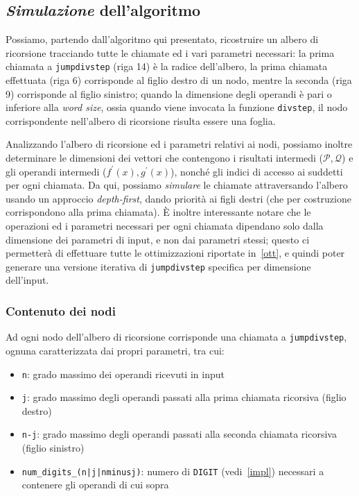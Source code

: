     \subsection*{\textbf{\textit{Simulazione} dell'algoritmo}} Possiamo, partendo dall'algoritmo qui presentato, ricostruire un albero di ricorsione tracciando tutte le
    chiamate ed i vari parametri necessari: la prima chiamata a \texttt{jumpdivstep} (riga 14) è la radice dell'albero, 
    la prima chiamata effettuata (riga 6) corrisponde al figlio destro di un nodo, mentre la seconda (riga 9) corrisponde al
    figlio sinistro; quando la dimensione degli operandi è pari o inferiore alla \textit{word size}, ossia quando viene 
    invocata la funzione \texttt{divstep}, il nodo corrispondente nell'albero di ricorsione risulta essere una foglia.
    
    Analizzando l'albero di ricorsione ed i parametri relativi ai nodi, possiamo inoltre determinare le dimensioni
    dei vettori che contengono i risultati intermedi ($\mathcal{P}, \mathcal{Q}$) e gli operandi intermedi
    ($f^{\prime}(x), g^{\prime}(x)$), nonché gli indici di accesso ai suddetti per ogni chiamata. Da qui, possiamo \textit{simulare}
    le chiamate attraversando l'albero usando un approccio \textit{depth-first}, dando priorità ai figli destri
    (che per costruzione corrispondono alla prima chiamata). 
    È inoltre interessante notare che le operazioni ed i parametri necessari per ogni chiamata dipendano solo dalla 
    dimensione dei parametri di input, e non dai parametri stessi; questo ci permetterà di effettuare tutte le ottimizzazioni
    riportate in~\ref{ott}, e quindi poter generare una versione
    iterativa di \texttt{jumpdivstep} specifica per dimensione dell'input.

    \subsubsection*{Contenuto dei nodi}
    Ad ogni nodo dell'albero di ricorsione corrisponde una chiamata a \texttt{jumpdivstep}, ognuna caratterizzata
    dai propri parametri, tra cui:
    \begin{itemize}
        \item \texttt{n}: grado massimo dei operandi ricevuti in input
        \item \texttt{j}: grado massimo degli operandi passati alla prima chiamata ricorsiva (figlio destro)
        \item \texttt{n-j}: grado massimo degli operandi passati alla seconda chiamata ricorsiva (figlio sinistro)
        \item \texttt{num\_digits\_(n|j|nminusj)}: numero di \texttt{DIGIT} (vedi~\ref{impl}) necessari a contenere gli operandi di cui sopra
    \end{itemize}


